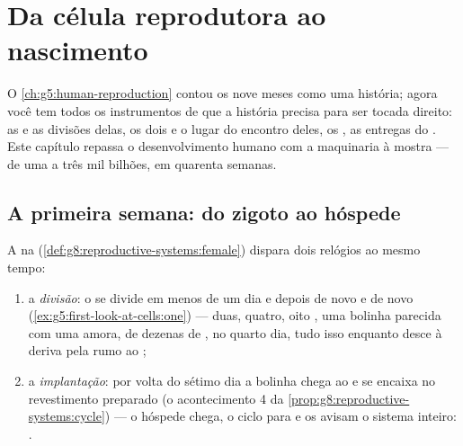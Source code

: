 \chapter{Da célula reprodutora ao nascimento}\label{ch:g8:from-egg-to-birth}

O \cref{ch:g5:human-reproduction} contou os nove meses como uma
história; agora você tem todos os instrumentos de que a história
precisa para ser tocada direito: as  e as divisões delas, os
dois  e o lugar do encontro deles, os , as entregas do
. Este capítulo repassa o desenvolvimento humano com a
maquinaria à mostra --- de uma  a três mil bilhões, em quarenta
semanas.

\section{A primeira semana: do zigoto ao hóspede}

\begin{proposition}\label{prop:g8:from-egg-to-birth:firstweek}
A  na 
(\cref{def:g8:reproductive-systems:female}) dispara dois relógios ao
mesmo tempo:
\begin{enumerate}
  \item a \emph{divisão}: o  se divide em menos de um dia e
        depois de novo e de novo
        (\cref{ex:g5:first-look-at-cells:one}) --- duas, quatro, oito
        , uma bolinha parecida com uma amora, de dezenas de
        , no quarto dia, tudo isso enquanto desce à deriva pela
         rumo ao ;
  \item a \emph{implantação}: por volta do sétimo dia a bolinha chega
        ao  e se encaixa no revestimento preparado (o
        acontecimento 4 da \cref{prop:g8:reproductive-systems:cycle})
        --- o hóspede chega, o ciclo para e os  avisam o
        sistema inteiro: .
\end{enumerate}
\end{proposition}
\admitted

